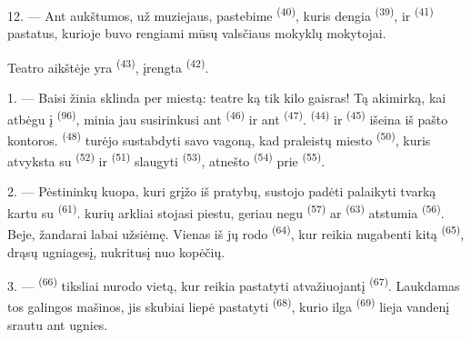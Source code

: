 12. --- Ant aukštumos, už muziejaus, pastebime  \textsuperscript{(40)},
kuris dengia  \textsuperscript{(39)}, ir 
\textsuperscript{(41)} pastatus, kurioje buvo rengiami mūsų valsčiaus mokyklų
mokytojai.

Teatro aikštėje yra  \textsuperscript{(43)}, įrengta
 \textsuperscript{(42)}.

\VUsaut{5.0mm}
\VUsaut{3.0mm}

\VUsaut{3.4mm}

1. --- Baisi žinia sklinda per miestą: teatre ką tik kilo gaisras! Tą akimirką, kai
atbėgu į  \textsuperscript{(96)}, minia jau susirinkusi ant
 \textsuperscript{(46)} ir ant 
\textsuperscript{(47)}.  \textsuperscript{(44)} ir
 \textsuperscript{(45)} išeina iš pašto kontoros.
 \textsuperscript{(48)} turėjo sustabdyti savo vagoną,
kad praleistų miesto  \textsuperscript{(50)}, kuris
atvyksta su  \textsuperscript{(52)} ir 
\textsuperscript{(51)} slaugyti  \textsuperscript{(53)}, atnešto
 \textsuperscript{(54)} prie 
\textsuperscript{(55)}.

2. --- Pėstininkų kuopa, kuri grįžo iš pratybų, sustojo padėti palaikyti tvarką kartu
su  \textsuperscript{(61)}. 
kurių arkliai stojasi piestu, geriau negu  \textsuperscript{(57)} ar
 \textsuperscript{(63)} atstumia 
\textsuperscript{(56)}. Beje, žandarai labai užsiėmę. Vienas iš jų rodo
 \textsuperscript{(64)}, kur reikia nugabenti kitą
 \textsuperscript{(65)}, drąsų ugniagesį, nukritusį nuo
kopėčių.

3. ---  \textsuperscript{(66)} tiksliai nurodo vietą, kur reikia
pastatyti atvažiuojantį  \textsuperscript{(67)}. Laukdamas tos
galingos mašinos, jis skubiai liepė pastatyti 
\textsuperscript{(68)}, kurio ilga  \textsuperscript{(69)} lieja vandenį
srautu ant ugnies.

